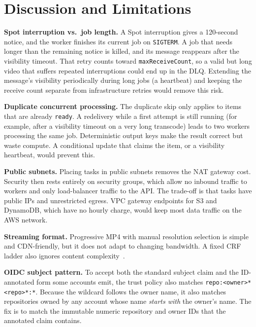 \documentclass[conference]{IEEEtran}
\begin{document}
\section{Discussion and Limitations}\label{sec:discussion}

\textbf{Spot interruption vs.\ job length.} A Spot interruption gives a 120-second notice, and the worker finishes its current job on \texttt{SIGTERM}. A job that needs longer than the remaining notice is killed, and its message reappears after the visibility timeout. That retry counts toward \texttt{maxReceiveCount}, so a valid but long video that suffers repeated interruptions could end up in the DLQ. Extending the message's visibility periodically during long jobs (a heartbeat) and keeping the receive count separate from infrastructure retries would remove this risk.

\textbf{Duplicate concurrent processing.} The duplicate skip only applies to items that are already \texttt{ready}. A redelivery while a first attempt is still running (for example, after a visibility timeout on a very long transcode) leads to two workers processing the same job. Deterministic output keys make the result correct but waste compute. A conditional update that claims the item, or a visibility heartbeat, would prevent this.

\textbf{Public subnets.} Placing tasks in public subnets removes the NAT gateway cost. Security then rests entirely on security groups, which allow no inbound traffic to workers and only load-balancer traffic to the API. The trade-off is that tasks have public IPs and unrestricted egress. VPC gateway endpoints for S3 and DynamoDB, which have no hourly charge, would keep most data traffic on the AWS network.

\textbf{Streaming format.} Progressive MP4 with manual resolution selection is simple and CDN-friendly, but it does not adapt to changing bandwidth. A fixed CRF ladder also ignores content complexity~\cite{netflix_pertitle}.

\textbf{OIDC subject pattern.} To accept both the standard subject claim and the ID-annotated form some accounts emit, the trust policy also matches \texttt{repo:<owner>*<repo>*:*}. Because the wildcard follows the owner name, it also matches repositories owned by any account whose name \emph{starts with} the owner's name. The fix is to match the immutable numeric repository and owner IDs that the annotated claim contains.
\end{document}
